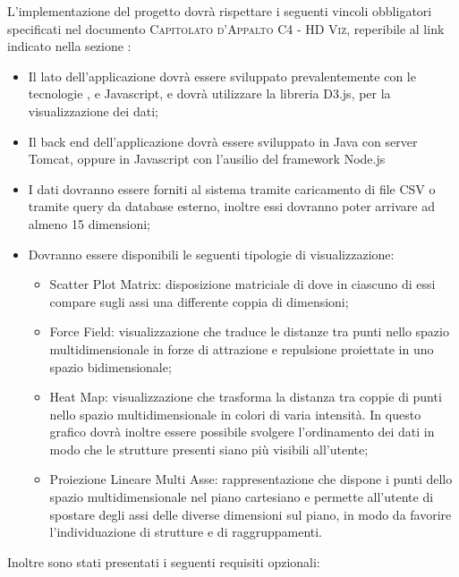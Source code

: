 \documentclass[../analisi-dei-requisiti.tex]{subfiles}
\begin{document}
L'implementazione del progetto dovrà rispettare i seguenti vincoli obbligatori specificati nel documento 
\textsc{Capitolato d'Appalto C4 - HD Viz}, reperibile al link indicato nella sezione :
\begin{itemize}
    \item Il lato  dell'applicazione dovrà essere sviluppato prevalentemente con le tecnologie 
    ,  e Javascript, e dovrà utilizzare la libreria D3.js, per la 
    visualizzazione dei dati;
    \item Il back end dell'applicazione dovrà essere sviluppato in Java con server Tomcat, 
    oppure in Javascript con l'ausilio del framework Node.js
    \item I dati dovranno essere forniti al sistema tramite caricamento di file CSV o tramite query da database 
    esterno, inoltre essi dovranno poter arrivare ad almeno 15 dimensioni;
    \item Dovranno essere disponibili le seguenti tipologie di visualizzazione:
    \begin{itemize}
        \item Scatter Plot Matrix: disposizione matriciale di  dove in ciascuno di essi compare 
        sugli assi una differente coppia di dimensioni;
        \item Force Field: visualizzazione che traduce le distanze tra punti nello spazio multidimensionale in forze 
        di attrazione e repulsione proiettate in uno spazio bidimensionale;
        \item Heat Map: visualizzazione che trasforma la distanza tra coppie di punti nello spazio multidimensionale in 
        colori di varia intensità. In questo grafico dovrà inoltre essere possibile svolgere l'ordinamento dei dati in 
        modo che le strutture presenti siano più visibili all'utente;
        \item Proiezione Lineare Multi Asse: rappresentazione che dispone i punti dello spazio multidimensionale nel 
        piano cartesiano e permette all'utente di spostare degli assi delle diverse dimensioni sul piano, in modo da 
        favorire l'individuazione di strutture e di raggruppamenti.
    \end{itemize}
\end{itemize}
Inoltre sono stati presentati i seguenti requisiti opzionali:
\end{document}
